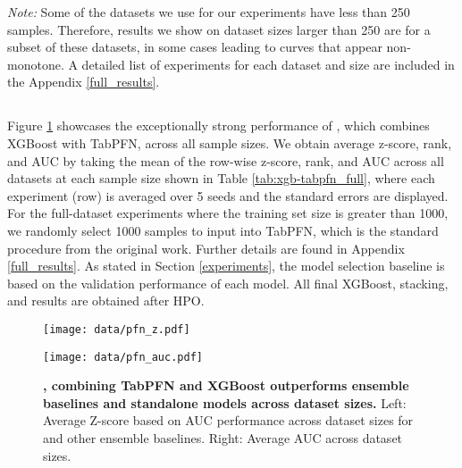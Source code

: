 \textit{Note:} Some of the datasets we use for our experiments have less than 250 samples. Therefore, results we show on dataset sizes larger than 250 are for a subset of these datasets, in some cases leading to curves that appear non-monotone. A detailed list of experiments for each dataset and size are included in the Appendix \ref{full_results}. 


\subsection{\methodnamepfn}

Figure \ref{fig:pfn} showcases the exceptionally strong performance of \methodnamepfn, which combines XGBoost with TabPFN, across all sample sizes. We obtain average z-score, rank, and AUC by taking the mean of the row-wise z-score, rank, and AUC across all datasets at each sample size shown in Table \ref{tab:xgb-tabpfn_full}, where each experiment (row) is averaged over 5 seeds and the standard errors are displayed. For the full-dataset experiments where the training set size is greater than 1000, we randomly select 1000 samples to input into TabPFN, which is the standard procedure from the original work. Further details are found in Appendix \ref{full_results}. As stated in Section \ref{experiments}, the model selection baseline is based on the validation performance of each model. All final XGBoost, stacking, and \methodnamepfn results are obtained after HPO.

 

\begin{figure}
    \centering
    \begin{minipage}{0.49\linewidth}
        \centering
        \texttt{[image: data/pfn\_z.pdf]}
    \end{minipage}
    \hfill
    \begin{minipage}{0.49\linewidth}
        \centering
        \texttt{[image: data/pfn\_auc.pdf]}
    \end{minipage}
    \caption{\textbf{\methodnamepfn, combining TabPFN and XGBoost outperforms ensemble baselines and standalone models across dataset sizes.} Left: Average Z-score based on AUC performance across dataset sizes for \methodnamepfn and other ensemble baselines. Right: Average AUC across dataset sizes.}
    \label{fig:pfn}
\end{figure}



\subsection{\methodname}

